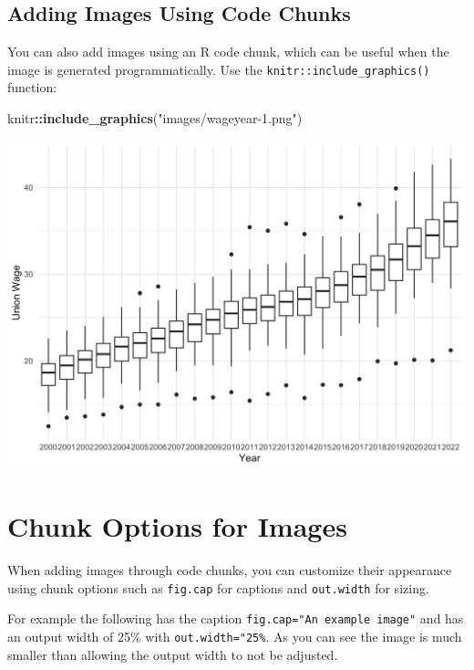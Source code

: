 \documentclass[
]{book}
\newenvironment{Shaded}{\begin{snugshade}}{\end{snugshade}}
\newcommand{\FunctionTok}[1]{\textcolor[rgb]{0.13,0.29,0.53}{\textbf{#1}}}
\newcommand{\NormalTok}[1]{#1}
\newcommand{\SpecialCharTok}[1]{\textcolor[rgb]{0.81,0.36,0.00}{\textbf{#1}}}
\newcommand{\StringTok}[1]{\textcolor[rgb]{0.31,0.60,0.02}{#1}}
\theoremstyle{definition}
\theoremstyle{definition}
\theoremstyle{definition}
\theoremstyle{definition}
\theoremstyle{remark}
\begin{document}
\subsection{Adding Images Using Code Chunks}\label{adding-images-using-code-chunks}

You can also add images using an R code chunk, which can be useful when the image is generated programmatically. Use the \texttt{knitr::include\_graphics()} function:

\begin{Shaded}
\begin{Highlighting}[]
\NormalTok{knitr}\SpecialCharTok{::}\FunctionTok{include\_graphics}\NormalTok{(}\StringTok{"images/wageyear{-}1.png"}\NormalTok{)}
\end{Highlighting}
\end{Shaded}

\includegraphics[width=18.67in]{images/wageyear-1}

\section{Chunk Options for Images}\label{chunk-options-for-images}

When adding images through code chunks, you can customize their appearance using chunk options such as \texttt{fig.cap} for captions and \texttt{out.width} for sizing.

For example the following has the caption \texttt{fig.cap="An\ example\ image"} and has an output width of 25\% with \texttt{out.width="25\%}. As you can see the image is much smaller than allowing the output width to not be adjusted.
\end{document}
